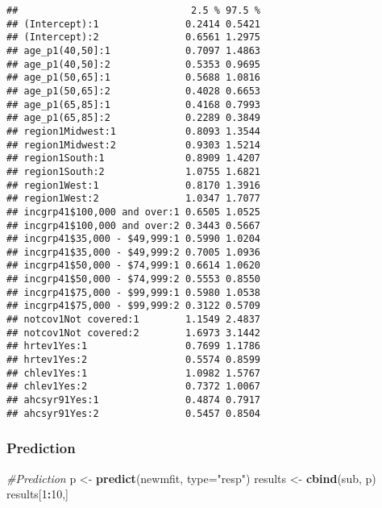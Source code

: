 \documentclass[]{article}
\newenvironment{Shaded}{\begin{snugshade}}{\end{snugshade}}
\newcommand{\CommentTok}[1]{\textcolor[rgb]{0.56,0.35,0.01}{\textit{#1}}}
\newcommand{\DataTypeTok}[1]{\textcolor[rgb]{0.13,0.29,0.53}{#1}}
\newcommand{\DecValTok}[1]{\textcolor[rgb]{0.00,0.00,0.81}{#1}}
\newcommand{\KeywordTok}[1]{\textcolor[rgb]{0.13,0.29,0.53}{\textbf{#1}}}
\newcommand{\NormalTok}[1]{#1}
\newcommand{\OperatorTok}[1]{\textcolor[rgb]{0.81,0.36,0.00}{\textbf{#1}}}
\newcommand{\StringTok}[1]{\textcolor[rgb]{0.31,0.60,0.02}{#1}}
\begin{document}
\begin{verbatim}
##                              2.5 % 97.5 %
## (Intercept):1               0.2414 0.5421
## (Intercept):2               0.6561 1.2975
## age_p1(40,50]:1             0.7097 1.4863
## age_p1(40,50]:2             0.5353 0.9695
## age_p1(50,65]:1             0.5688 1.0816
## age_p1(50,65]:2             0.4028 0.6653
## age_p1(65,85]:1             0.4168 0.7993
## age_p1(65,85]:2             0.2289 0.3849
## region1Midwest:1            0.8093 1.3544
## region1Midwest:2            0.9303 1.5214
## region1South:1              0.8909 1.4207
## region1South:2              1.0755 1.6821
## region1West:1               0.8170 1.3916
## region1West:2               1.0347 1.7077
## incgrp41$100,000 and over:1 0.6505 1.0525
## incgrp41$100,000 and over:2 0.3443 0.5667
## incgrp41$35,000 - $49,999:1 0.5990 1.0204
## incgrp41$35,000 - $49,999:2 0.7005 1.0936
## incgrp41$50,000 - $74,999:1 0.6614 1.0620
## incgrp41$50,000 - $74,999:2 0.5553 0.8550
## incgrp41$75,000 - $99,999:1 0.5980 1.0538
## incgrp41$75,000 - $99,999:2 0.3122 0.5709
## notcov1Not covered:1        1.1549 2.4837
## notcov1Not covered:2        1.6973 3.1442
## hrtev1Yes:1                 0.7699 1.1786
## hrtev1Yes:2                 0.5574 0.8599
## chlev1Yes:1                 1.0982 1.5767
## chlev1Yes:2                 0.7372 1.0067
## ahcsyr91Yes:1               0.4874 0.7917
## ahcsyr91Yes:2               0.5457 0.8504
\end{verbatim}

\hypertarget{prediction}{%
\subsubsection{Prediction}\label{prediction}}

\begin{Shaded}
\begin{Highlighting}[]
\CommentTok{#Prediction}
\NormalTok{p <-}\StringTok{ }\KeywordTok{predict}\NormalTok{(newmfit, }\DataTypeTok{type=}\StringTok{"resp"}\NormalTok{)}
\NormalTok{results <-}\StringTok{ }\KeywordTok{cbind}\NormalTok{(sub, p)}
\NormalTok{results[}\DecValTok{1}\OperatorTok{:}\DecValTok{10}\NormalTok{,]}
\end{Highlighting}
\end{Shaded}
\end{document}
